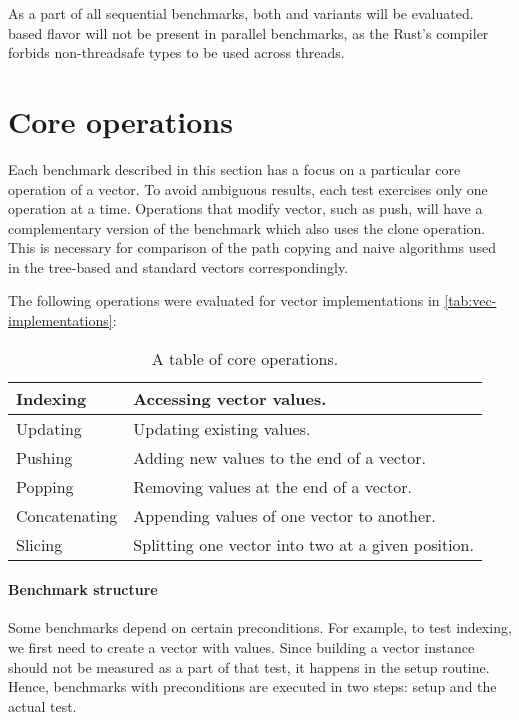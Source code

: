As a part of all sequential benchmarks, both \rc{} and \arc{} variants will be evaluated. \rc{} based flavor will not be present in parallel benchmarks, as the Rust's compiler forbids non-threadsafe types to be used across threads. 

\section{Core operations}
Each benchmark described in this section has a focus on a particular core operation of a vector. To avoid ambiguous results, each test exercises only one operation at a time. Operations that modify vector, such as push, will have a complementary version of the benchmark which also uses the clone operation. This is necessary for comparison of the path copying and naive algorithms used in the tree-based and standard vectors correspondingly. 

The following operations were evaluated for vector implementations in \ref{tab:vec-implementations}:
\begin{table}[!htbp]
    \centering

    \begin{tabular} { |l| p{10cm} | }
        \hline 
        Indexing & Accessing vector values. \\ \hline
        Updating & Updating existing values. \\ \hline
        Pushing & Adding new values to the end of a vector. \\ \hline
        Popping & Removing values at the end of a vector. \\ \hline
        Concatenating & Appending values of one vector to another. \\ \hline
        Slicing & Splitting one vector into two at a given position. \\ \hline
    \end{tabular}
    
    \label{tab:vec-core-operations}
    \caption{A table of core operations.}
\end{table}

\paragraph*{Benchmark structure}
Some benchmarks depend on certain preconditions. For example, to test indexing, we first need to create a vector with values. Since building a vector instance should not be measured as a part of that test, it happens in the setup routine. Hence, benchmarks with preconditions are executed in two steps: setup and the actual test. 

